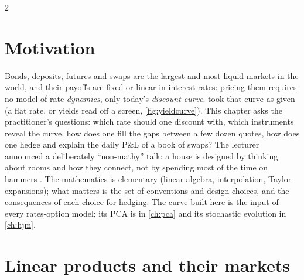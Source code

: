 \begin{paracol}{2}
\section*{Motivation}
Bonds, deposits, futures and swaps are the largest and most liquid markets in the world, and their payoffs are
fixed or linear in interest rates: pricing them requires no model of rate \emph{dynamics}, only today's
\emph{discount curve}.  took that curve as given (a flat rate, or yields read off a screen,
\cref{fig:yieldcurve}). This chapter asks the practitioner's questions: which rate should one discount with,
which instruments reveal the curve, how does one fill the gaps between a few dozen quotes, how does one hedge
and explain the daily P\&L of a book of swaps? The lecturer announced a deliberately ``non-mathy'' talk: a
house is designed by thinking about rooms and how they connect, not by spending most of the time on hammers
. The mathematics is elementary (linear algebra, interpolation, Taylor expansions); what matters
is the set of conventions and design choices, and the consequences of each choice for hedging. The curve built
here is the input of every rates-option model; its PCA is in \cref{ch:pca} and its stochastic evolution in
\cref{ch:hjm}.

\section{Linear products and their markets}\label{ch06:sec-markets}


\end{paracol}
